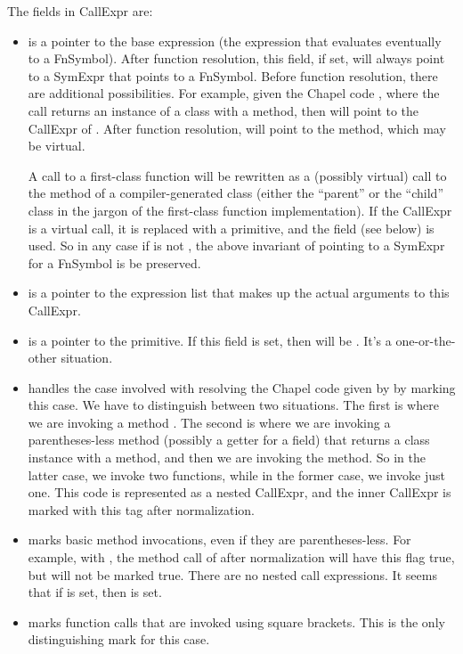 \documentclass[10pt]{article}
\begin{document}
The fields in CallExpr are:
\begin{itemize}
\item {} is a pointer to the base expression (the
  expression that evaluates eventually to a FnSymbol).  After function
  resolution, this field, if set, will always point to a SymExpr that
  points to a FnSymbol.  Before function resolution, there are
  additional possibilities.  For example, given the Chapel code
  , where the call  returns an instance of a
  class with a  method, then  will point
  to the CallExpr of . After function resolution,
   will point to the  method, which may be virtual.

  A call to a first-class function will be rewritten as a (possibly
  virtual) call to the  method of a compiler-generated
  class (either the ``parent'' or the ``child'' class in the jargon of
  the first-class function implementation).  If the CallExpr is a
  virtual call, it is replaced with a primitive, and the
   field (see below) is used.  So in any case if
   is not , the above invariant of pointing to a
  SymExpr for a FnSymbol is be preserved.
\item {} is a pointer to the expression list that
  makes up the actual arguments to this CallExpr.
\item {} is a pointer to the primitive.  If
  this field is set, then  will be .  It's a
  one-or-the-other situation.
\item {} handles the case involved with resolving
  the Chapel code given by  by marking this case.  We have
  to distinguish between two situations.  The first is where we are invoking a
  method .  The second is where we are invoking a
  parentheses-less method (possibly a getter for a field) that returns
  a class instance with a  method, and then we are invoking
  the  method.  So in the latter case, we invoke two
  functions, while in the former case, we invoke just one.  This code
  is represented as a nested CallExpr, and the inner CallExpr is
  marked with this tag after normalization.
\item {} marks basic method invocations, even if they
  are parentheses-less.  For example, with , the method call
  of  after normalization will have this flag true, but
   will not be marked true.  There are no nested call
  expressions.  It seems that if  is set, then
   is set.
\item {} marks function calls that are invoked using
  square brackets.  This is the only distinguishing mark for this
  case.
\end{itemize}
\end{document}

